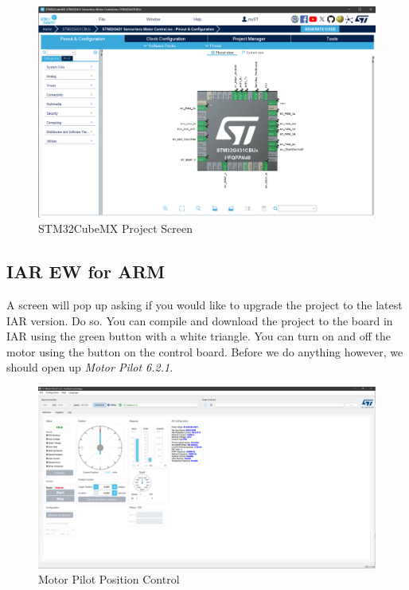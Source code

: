 \documentclass[10pt]{article}
\begin{document}
            \begin{figure}[H]
                \centerline{\includegraphics[width=\textwidth]{References/CubeMX.png}}
                \caption{STM32CubeMX Project Screen}
                    \end{figure}
		\FloatBarrier \subsection{IAR EW for ARM}
            A screen will pop up asking if you would like to upgrade the project to the latest IAR version. Do so. You can compile and download the project to the board in IAR using the green button with a white triangle. You can turn on and off the motor using the button on the control board. Before we do anything however, we should open up \emph{Motor Pilot 6.2.1}.
            \begin{figure}[H]
                \centerline{\includegraphics[width=\textwidth]{References/Motor Pilot Position Control.png}}
                \caption{Motor Pilot Position Control}
            \end{figure}
\end{document}
